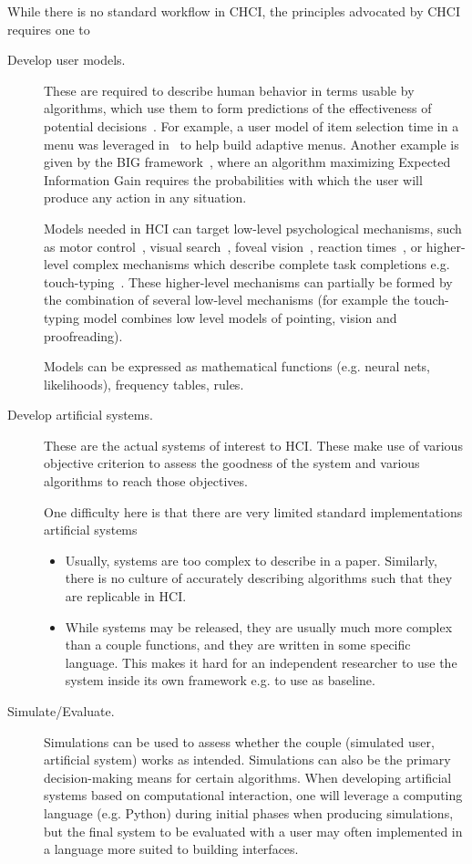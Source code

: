 \documentclass[12pt,a4paper]{article}
\begin{document}
While there is no standard workflow in CHCI, the principles advocated by CHCI requires one to
\begin{description}
\item[Develop user models.] These are required to describe human behavior in terms usable by algorithms, which use them to form predictions of the effectiveness of potential decisions~\cite{oulasvirta2021}. For example, a user model of item selection time in a menu was leveraged in~\cite{todi2021} to help build adaptive menus. Another example is given by the BIG framework~\cite{liu2017, liu2018}, where an algorithm maximizing Expected Information Gain requires the probabilities with which the user will produce any action in any situation.


Models needed in HCI can target low-level psychological mechanisms, such as motor control~\cite{gori2020}, visual search~\cite{acharya2017}, foveal vision~\cite{chen2021}, reaction times~\cite{liu2020}, or higher-level complex mechanisms which describe complete task completions e.g. touch-typing~\cite{jokinen2021}. These higher-level mechanisms can partially be formed by the combination of several low-level mechanisms (for example the touch-typing model combines low level models of pointing, vision and proofreading).


Models can be expressed as mathematical functions (e.g. neural nets, likelihoods), frequency tables, rules.

\item[Develop artificial systems.] These are the actual systems of interest to HCI. These make use of various objective criterion to assess the goodness of the system and various algorithms to reach those objectives.

One difficulty here is that there are very limited standard implementations artificial systems
\begin{itemize}
\item Usually, systems are too complex to describe in a paper. Similarly, there is no culture of accurately describing algorithms such that they are replicable in HCI.
\item While systems may be released, they are usually much more complex than a couple functions, and they are written in some specific language. This makes it hard for an independent researcher to use the system inside its own framework e.g. to use as baseline.
\end{itemize}


\item[Simulate/Evaluate.] Simulations can be used to assess whether the couple (simulated user, artificial system) works as intended. Simulations can also be the primary decision-making means for certain algorithms.
When developing artificial systems based on computational interaction, one will leverage a computing language (e.g. Python) during initial phases when producing simulations, but the final system to be evaluated with a user may often implemented in a language more suited to building interfaces.
\end{description}
\end{document}
